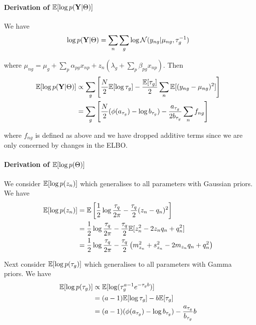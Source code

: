 \paragraph{Derivation of $\mathbb{E}[\log p({\bf Y} | \Theta)]$}

We have
\begin{equation}
\log p({\bf Y} | \Theta) = \sum_n \sum_g \log \mathcal{N}(y_{ng} | \mu_{ng}, \tau_g^{-1})
\end{equation}

where $\mu_{ng} = \mu_g + \sum_p \alpha_{pg} x_{np} + z_n \left( \lambda_g + \sum_p \beta_{pg} x_{np} \right)$. Then
\begin{equation}
\begin{aligned}
\mathbb{E}[ \log p({\bf Y} | \Theta) ] & \propto \sum_g \left[ \frac{N}{2} \mathbb{E}[\log \tau_g] -
\frac{\mathbb{E}[\tau_g]}{2} \sum_n \mathbb{E}[ (y_{ng} - \mu_{ng})^2 ] \right] \\
& = \sum_g \left[
\frac{N}{2} (\phi(a_{\tau_g}) - \log b_{\tau_g}) - \frac{a_{\tau_g}}{2 b_{\tau_g}} \sum_n f_{ng}
\right]
\end{aligned}
\end{equation}

where $f_{ng}$ is defined as above and we have dropped additive terms since we are only concerned by changes in the ELBO.

\paragraph{Derivation of  $\mathbb{E}[\log p(\Theta)]$}

We consider $\mathbb{E}[\log p (z_n)]$ which generalises to all parameters with Gaussian priors. We have
\begin{equation}
\begin{aligned}
\mathbb{E}[\log p (z_n)] &= \mathbb{E}\left[ \frac{1}{2} \log \frac{\tau_q}{2 \pi} - \frac{\tau_q}{2} (z_n - q_n)^2 \right] \\
& = \frac{1}{2} \log \frac{\tau_q}{2 \pi} - \frac{\tau_q}{2} \mathbb{E}[ z_n^2 - 2 z_n q_n + q_n^2 ] \\
& = \frac{1}{2} \log \frac{\tau_q}{2 \pi} - \frac{\tau_q}{2} \left( m_{z_n}^2 + s_{z_n}^2 - 2 m_{z_n} q_n + q_n^2 \right)
\end{aligned}
\end{equation}

Next consider $\mathbb{E}[\log p (\tau_g)]$ which generalises to all parameters with Gamma priors. We have
\begin{equation}
\begin{aligned}
\mathbb{E}[\log p(\tau_g)] & \propto \mathbb{E}[\log(\tau_g^{a-1} e^{-\tau_g b})] \\
& = (a-1) \mathbb{E}[\log \tau_g] - b \mathbb{E}[\tau_g] \\
& = (a-1)(\phi(a_{\tau_g}) - \log b_{\tau_g}) - \frac{a_{\tau_g}}{b_{\tau_g}} b
\end{aligned}
\end{equation}

